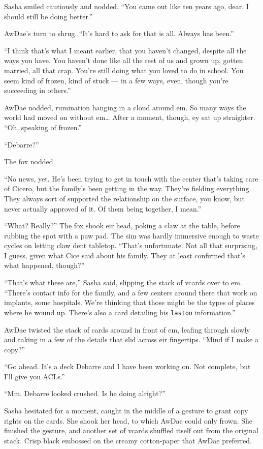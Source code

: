 Sasha smiled cautiously and nodded. ``You came out like ten years ago, dear. I should still be doing better.''

AwDae's turn to shrug. ``It's hard to ask for that is all. Always has been.''

``I think that's what I meant earlier, that you haven't changed, despite all the ways you have. You haven't done like all the rest of us and grown up, gotten married, all that crap. You're still doing what you loved to do in school. You seem kind of frozen, kind of stuck --- in a few ways, even, though you're succeeding in others.''

AwDae nodded, rumination hanging in a cloud around em. So many ways the world had moved on without em\ldots{} After a moment, though, ey sat up straighter. ``Oh, speaking of frozen.''

``Debarre?''

The fox nodded.

``No news, yet. He's been trying to get in touch with the center that's taking care of Cicero, but the family's been getting in the way. They're fielding everything. They always sort of supported the relationship on the surface, you know, but never actually approved of it. Of them being together, I mean.''

``What? Really?'' The fox shook eir head, poking a claw at the table, before rubbing the spot with a paw pad. The sim was hardly immersive enough to waste cycles on letting claw dent tabletop. ``That's unfortunate. Not all that surprising, I guess, given what Cice said about his family. They at least confirmed that's what happened, though?''

``That's what these are,'' Sasha said, slipping the stack of vcards over to em. ``There's contact info for the family, and a few centers around there that work on implants, some hospitals. We're thinking that those might be the types of places where he wound up. There's also a card detailing his \texttt{laston} information.''

AwDae twisted the stack of cards around in front of em, leafing through slowly and taking in a few of the details that slid across eir fingertips. ``Mind if I make a copy?''

``Go ahead. It's a deck Debarre and I have been working on. Not complete, but I'll give you ACLs.''

``Mm. Debarre looked crushed. Is he doing alright?''

Sasha hesitated for a moment, caught in the middle of a gesture to grant copy rights on the cards. She shook her head, to which AwDae could only frown. She finished the gesture, and another set of vcards shuffled itself out from the original stack. Crisp black embossed on the creamy cotton-paper that AwDae preferred.

